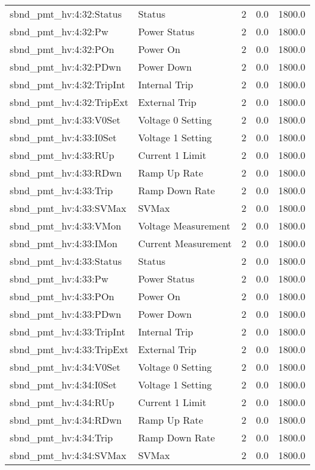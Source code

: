 \begin{center}
\begin{longtable}{l | l l l l }
sbnd\_pmt\_hv:4:32:Status & Status & 2 & 0.0 & 1800.0\\ 
sbnd\_pmt\_hv:4:32:Pw & Power Status & 2 & 0.0 & 1800.0\\ 
sbnd\_pmt\_hv:4:32:POn & Power On & 2 & 0.0 & 1800.0\\ 
sbnd\_pmt\_hv:4:32:PDwn & Power Down & 2 & 0.0 & 1800.0\\ 
sbnd\_pmt\_hv:4:32:TripInt & Internal Trip & 2 & 0.0 & 1800.0\\ 
sbnd\_pmt\_hv:4:32:TripExt & External Trip & 2 & 0.0 & 1800.0\\ 
sbnd\_pmt\_hv:4:33:V0Set & Voltage 0 Setting & 2 & 0.0 & 1800.0\\ 
sbnd\_pmt\_hv:4:33:I0Set & Voltage 1 Setting & 2 & 0.0 & 1800.0\\ 
sbnd\_pmt\_hv:4:33:RUp & Current 1 Limit & 2 & 0.0 & 1800.0\\ 
sbnd\_pmt\_hv:4:33:RDwn & Ramp Up Rate & 2 & 0.0 & 1800.0\\ 
sbnd\_pmt\_hv:4:33:Trip & Ramp Down Rate & 2 & 0.0 & 1800.0\\ 
sbnd\_pmt\_hv:4:33:SVMax & SVMax & 2 & 0.0 & 1800.0\\ 
sbnd\_pmt\_hv:4:33:VMon & Voltage Measurement & 2 & 0.0 & 1800.0\\ 
sbnd\_pmt\_hv:4:33:IMon & Current Measurement & 2 & 0.0 & 1800.0\\ 
sbnd\_pmt\_hv:4:33:Status & Status & 2 & 0.0 & 1800.0\\ 
sbnd\_pmt\_hv:4:33:Pw & Power Status & 2 & 0.0 & 1800.0\\ 
sbnd\_pmt\_hv:4:33:POn & Power On & 2 & 0.0 & 1800.0\\ 
sbnd\_pmt\_hv:4:33:PDwn & Power Down & 2 & 0.0 & 1800.0\\ 
sbnd\_pmt\_hv:4:33:TripInt & Internal Trip & 2 & 0.0 & 1800.0\\ 
sbnd\_pmt\_hv:4:33:TripExt & External Trip & 2 & 0.0 & 1800.0\\ 
sbnd\_pmt\_hv:4:34:V0Set & Voltage 0 Setting & 2 & 0.0 & 1800.0\\ 
sbnd\_pmt\_hv:4:34:I0Set & Voltage 1 Setting & 2 & 0.0 & 1800.0\\ 
sbnd\_pmt\_hv:4:34:RUp & Current 1 Limit & 2 & 0.0 & 1800.0\\ 
sbnd\_pmt\_hv:4:34:RDwn & Ramp Up Rate & 2 & 0.0 & 1800.0\\ 
sbnd\_pmt\_hv:4:34:Trip & Ramp Down Rate & 2 & 0.0 & 1800.0\\ 
sbnd\_pmt\_hv:4:34:SVMax & SVMax & 2 & 0.0 & 1800.0\\ 

\end{longtable}
\end{center}
